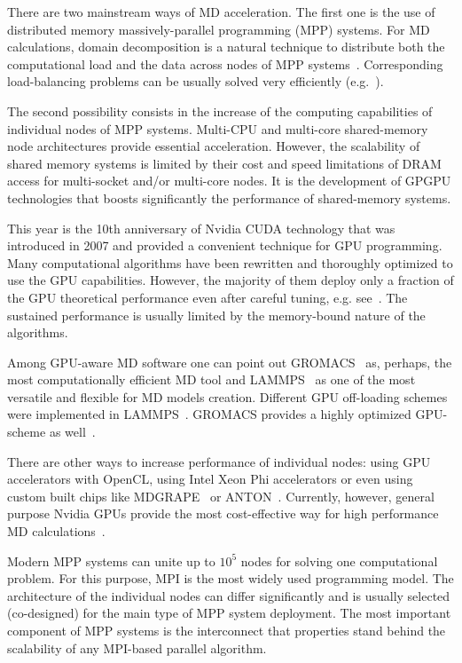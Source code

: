 \documentclass{llncs}
\begin{document}
There are two mainstream ways of MD acceleration. The first one is the use of distributed memory massively-parallel programming (MPP) systems. For MD calculations, domain decomposition is a natural technique to distribute both the computational load and the data across nodes of MPP systems~\cite{Sutmann2002}. Corresponding load-balancing problems can be usually solved very efficiently (e.g.~\cite{BegauSutmann-2015}).

The second possibility consists in the increase of the computing capabilities of individual nodes of MPP systems. Multi-CPU and multi-core shared-memory node architectures provide essential acceleration. However, the scalability of shared memory systems is limited by their cost and speed limitations of DRAM access for multi-socket and/or multi-core nodes. It is the development of GPGPU technologies that boosts significantly the performance of shared-memory systems.

This year is the 10th anniversary of Nvidia CUDA technology that was introduced in 2007 and provided a convenient technique for GPU programming. Many computational algorithms have been rewritten and thoroughly optimized to use the GPU capabilities. However, the majority of them deploy only a fraction of the GPU theoretical performance even after careful tuning, e.g. see~\cite{StegailovSmirnov-MatModCompSim2016,StegailovOrekhovSmirnov-PaCT2015,Wyrzykowski-3DMPDATAtoGPU-adaptation-2016}. The sustained performance is usually limited by the memory-bound nature of the algorithms.

Among GPU-aware MD software one can point out GROMACS~\cite{Berendsen199543} as, perhaps, the most computationally efficient MD tool and LAMMPS~\cite{LAMMPS1995} as one of the most versatile and flexible for MD models creation. Different GPU off-loading schemes were implemented in LAMMPS~\cite{Trott-etal-USER-CUDA-2010,Brown-etal-lammpsGPU-2011,Brown-etal-lammpsGPU-2012,CarterEdwards2014}. GROMACS provides a highly optimized GPU-scheme as well~\cite{Abraham201519}.

There are other ways to increase performance of individual nodes: using GPU accelerators with OpenCL, using Intel Xeon Phi accelerators or even using custom built chips like MDGRAPE~\cite{Ohmura20130387} or ANTON~\cite{Piana-Klepeis-Shaw-2014}. Currently, however, general purpose Nvidia GPUs provide the most cost-effective way for high performance MD calculations~\cite{Kutzner2015}. 

Modern MPP systems can unite up to $10^5$ nodes for solving one computational problem. For this purpose, MPI is the most widely used programming model. The architecture of the individual nodes can differ significantly and is usually selected (co-designed) for the main type of MPP system deployment. The most important component of MPP systems is the interconnect that properties stand behind the scalability of any MPI-based parallel algorithm.
\end{document}
